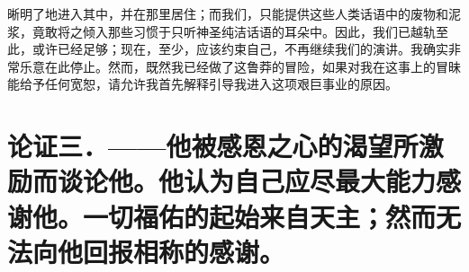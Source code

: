晰明了地进入其中，并在那里居住；而我们，只能提供这些人类话语中的废物和泥浆，竟敢将之倾入那些习惯于只听神圣纯洁话语的耳朵中。因此，我们已越轨至此，或许已经足够；现在，至少，应该约束自己，不再继续我们的演讲。我确实非常乐意在此停止。然而，既然我已经做了这鲁莽的冒险，如果对我在这事上的冒昧能给予任何宽恕，请允许我首先解释引导我进入这项艰巨事业的原因。\par


\section{论证三．——他被感恩之心的渴望所激励而谈论他。他认为自己应尽最大能力感谢他。一切福佑的起始来自天主；然而无法向他回报相称的感谢。}

